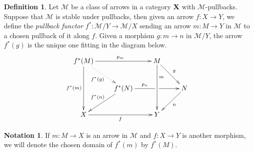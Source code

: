 \documentclass[a4paper]{article}
\def\X{\textbf {\textup{X}}}
\theoremstyle{definition}
\newtheorem{definition}[theorem]{Definition}
\newtheorem*{notation}{Notation}
\begin{document}
\begin{definition}
	Let $\mathcal{M}$ be a class of arrows in a category $\X$ with $\mathcal{M}$-pullbacks. Suppose that $\mathcal{M}$ is stable under pullbacks, then given an arrow $f\colon X\to Y$, we define the \emph{pullback functor} $f^*\colon \mathcal{M}/Y\to \mathcal{M}/X$ sending an arrow $m:M\to Y$ in $\mathcal{M}$ to a chosen pullback of it along $f$. Given a morphism $g:m\to n$ in $\mathcal{M}/Y$, the arrow $f^*(g)$ is the unique one fitting in the diagram below.
	\[\xymatrix{f^*(M)  \ar[dd]_{f^*(m)} \ar@{.>}[dr]_{f^*(g)}\ar[rr]^{p_m}&& M \ar[dr]^{g}\ar[dd]^(.3){m} \\&f^*(N)  \ar[rr]^(.35){p_n}|(.55)\hole \ar[dl]_{f^*(n)}&& N \ar[dl]^{n}\\ X \ar[rr]_{f}&& Y }\]
\end{definition}

\begin{notation}
	If $m\colon M\to X$ is an arrow in $\mathcal{M}$ and $f\colon X\to Y$ is another morphism, we will denote the chosen domain of $f^*(m)$ by $f^*(M)$.
\end{notation}
\end{document}
